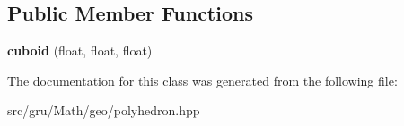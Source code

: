 \subsection*{\-Public \-Member \-Functions}
\begin{DoxyCompactItemize}
\item 
\hypertarget{classmath_1_1geo_1_1cuboid_a72bd7e6bf32ccd6928e375efa3036491}{{\bfseries cuboid} (float, float, float)}\label{classmath_1_1geo_1_1cuboid_a72bd7e6bf32ccd6928e375efa3036491}

\end{DoxyCompactItemize}


\-The documentation for this class was generated from the following file\-:\begin{DoxyCompactItemize}
\item 
src/gru/\-Math/geo/polyhedron.\-hpp\end{DoxyCompactItemize}
